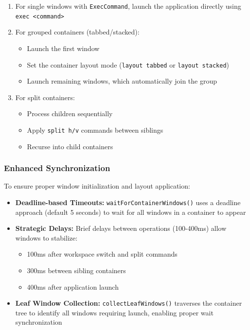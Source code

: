 \begin{enumerate}
    \item For single windows with \texttt{ExecCommand}, launch the application directly using \texttt{exec <command>}
    \item For grouped containers (tabbed/stacked):
    \begin{itemize}
        \item Launch the first window
        \item Set the container layout mode (\texttt{layout tabbed} or \texttt{layout stacked})
        \item Launch remaining windows, which automatically join the group
    \end{itemize}
    \item For split containers:
    \begin{itemize}
        \item Process children sequentially
        \item Apply \texttt{split h/v} commands between siblings
        \item Recurse into child containers
    \end{itemize}
\end{enumerate}

\subsubsection{Enhanced Synchronization}

To ensure proper window initialization and layout application:

\begin{itemize}
    \item \textbf{Deadline-based Timeouts:} \texttt{waitForContainerWindows()} uses a deadline approach (default 5 seconds) to wait for all windows in a container to appear
    \item \textbf{Strategic Delays:} Brief delays between operations (100-400ms) allow windows to stabilize:
    \begin{itemize}
        \item 100ms after workspace switch and split commands
        \item 300ms between sibling containers
        \item 400ms after application launch
    \end{itemize}
    \item \textbf{Leaf Window Collection:} \texttt{collectLeafWindows()} traverses the container tree to identify all windows requiring launch, enabling proper wait synchronization
\end{itemize}

